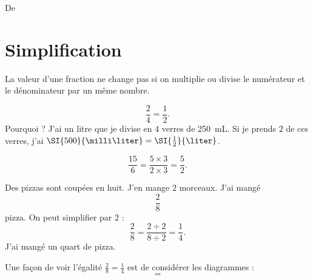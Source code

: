 

De \cite{NRHooXFvgpp5}

\section{Simplification}

\begin{Aretenir}
    La valeur d'une fraction ne change pas si on multiplie ou divise le numérateur et le dénominateur par un même nombre.
\end{Aretenir}

\begin{example}
    \begin{equation}
        \frac{ 2 }{ 4 }=\frac{ 1 }{2}.
    \end{equation}
    Pourquoi ? J'ai un litre que je divise en \( 4\) verres de \SI{250}{\milli\liter}. Si je prends \( 2\) de ces verres, j'ai \( \SI{500}{\milli\liter}=\SI{\frac{ 1 }{2}}{\liter}\).
\end{example}

\begin{example}
    \begin{equation}
        \frac{ 15 }{ 6 }=\frac{ 5\times 3 }{ 2\times 3 }=\frac{ 5 }{ 2 }.
    \end{equation}
\end{example}

\begin{example}
    Des pizzas sont coupées en huit. J'en mange \( 2\) morceaux. J'ai mangé
    \begin{equation}
        \frac{ 2 }{ 8 }
    \end{equation}
    pizza. On peut simplifier par \( 2\) :
    \begin{equation}
        \frac{ 2 }{ 8 }=\frac{ 2\div 2 }{ 8\div 2 }=\frac{1}{ 4 }.
    \end{equation}
    J'ai mangé un quart de pizza.

    Une façon de voir l'égalité \( \frac{ 2 }{ 8 }=\frac{ 1 }{ 4 }\) est de considérer les diagrammes :
    \begin{equation}
   
   =
   
    \end{equation}
\end{example}


